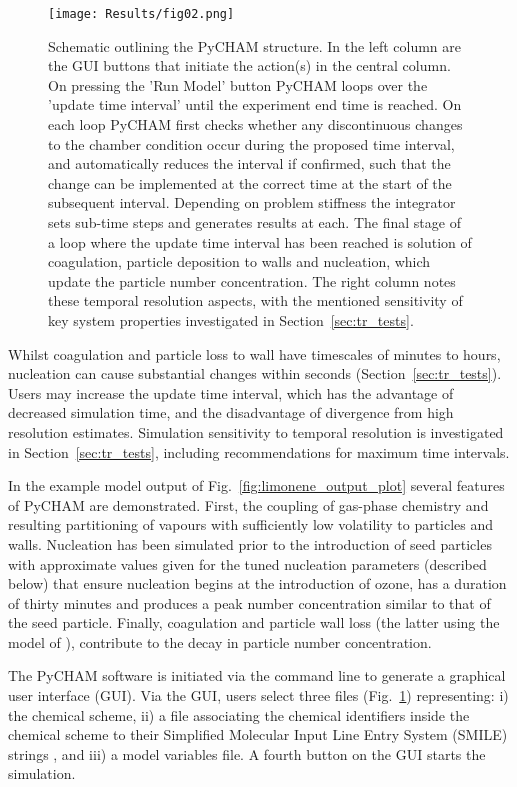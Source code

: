\documentclass[gmd, manuscript]{copernicus}
\begin{document}
\begin{figure}[t]
\texttt{[image: Results/fig02.png]}
\caption{Schematic outlining the PyCHAM structure.  In the left column are the GUI buttons that initiate the action(s) in the central column.  On pressing the 'Run Model' button PyCHAM loops over the 'update time interval' until the experiment end time is reached.  On each loop PyCHAM first checks whether any discontinuous changes to the chamber condition occur during the proposed time interval, and automatically reduces the interval if confirmed, such that the change can be implemented at the correct time at the start of the subsequent interval.  Depending on problem stiffness the integrator sets sub-time steps and generates results at each.  The final stage of a loop where the update time interval has been reached is solution of coagulation, particle deposition to walls and nucleation, which update the particle number concentration.  The right column notes these temporal resolution aspects, with the mentioned sensitivity of key system properties investigated in Section~\ref{sec:tr_tests}.}
\label{fig:schematic}
\end{figure}

Whilst coagulation and particle loss to wall have timescales of minutes to hours, nucleation can cause substantial changes within seconds (Section~\ref{sec:tr_tests}).  Users may increase the update time interval, which has the advantage of decreased simulation time, and the disadvantage of divergence from high resolution estimates.  Simulation sensitivity to temporal resolution is investigated in Section~\ref{sec:tr_tests}, including recommendations for maximum time intervals. 

In the example model output of Fig.~\ref{fig:limonene_output_plot} several features of PyCHAM are demonstrated.  First, the coupling of gas-phase chemistry and resulting partitioning of vapours with sufficiently low volatility to particles and walls.  Nucleation has been simulated prior to the introduction of seed particles with approximate values given for the tuned nucleation parameters (described below) that ensure nucleation begins at the introduction of ozone, has a duration of thirty minutes and produces a peak number concentration similar to that of the seed particle.  Finally, coagulation and particle wall loss (the latter using the model of \citet{McMurry1985}), contribute to the decay in particle number concentration.

The PyCHAM software is initiated via the command line to generate a graphical user interface (GUI).  Via the GUI, users select three files (Fig.~\ref{fig:schematic}) representing: i) the chemical scheme, ii) a file associating the chemical identifiers inside the chemical scheme to their Simplified Molecular Input Line Entry System (SMILE) strings \citep{Weininger1988}, and iii) a model variables file.  A fourth button on the GUI starts the simulation.
\end{document}
